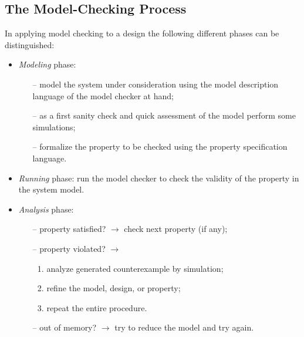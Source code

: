 \documentclass[a4paper,11pt]{article}
\begin{document}
\subsection{\textbf{The Model-Checking Process}} 

In applying model checking to a design the following different phases can be distinguished:
\begin{itemize} 
\item \textit{Modeling} phase:
\begin{itemize} 
\item[--] model 
the system under consideration using the model description language of the model checker at hand; 
\item[--] as a ﬁrst sanity check and quick assessment of the model perform some simulations; 
\item[--] formalize the property to be checked using the property speciﬁcation language. 
\end{itemize}
\item \textit{Running} phase: run the model checker to check the validity of the property in the system model. 
\item \textit{Analysis} phase: 
\begin{itemize}
\item[--]property satisﬁed? $\rightarrow$ check next property (if any); 
\item[--]property violated? $\rightarrow$
\begin{enumerate} 
\item analyze generated counterexample by simulation; 
\item reﬁne the model, design, or property; 
\item repeat the entire procedure. 
\end{enumerate}
\item[--]out of memory? $\rightarrow$ try to reduce the model and try again.
\end{itemize}
\end{itemize}
\end{document}
